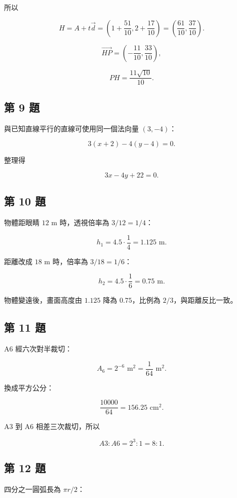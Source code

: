 \documentclass[11pt,a4paper]{article}
\begin{document}
所以

\[
H=A+t\vec d
=\left(1+\frac{51}{10},2+\frac{17}{10}\right)
=\left(\frac{61}{10},\frac{37}{10}\right).
\]

\[
\overrightarrow{HP}=\left(-\frac{11}{10},\frac{33}{10}\right),
\]

\[
PH=\frac{11\sqrt{10}}{10}.
\]

\subsection{第 9 題}\label{ux7b2c-9-ux984c}

與已知直線平行的直線可使用同一個法向量 \((3,-4)\)：

\[
3(x+2)-4(y-4)=0.
\]

整理得

\[
3x-4y+22=0.
\]

\subsection{第 10 題}\label{ux7b2c-10-ux984c}

物體距眼睛 \(12\text{ m}\) 時，透視倍率為 \(3/12=1/4\)：

\[
h_1=4.5\cdot\frac14=1.125\text{ m}.
\]

距離改成 \(18\text{ m}\) 時，倍率為 \(3/18=1/6\)：

\[
h_2=4.5\cdot\frac16=0.75\text{ m}.
\]

物體變遠後，畫面高度由 \(1.125\) 降為 \(0.75\)，比例為 \(2/3\)，與距離反比一致。

\subsection{第 11 題}\label{ux7b2c-11-ux984c}

A6 經六次對半裁切：

\[
A_6=2^{-6}\text{ m}^2=\frac1{64}\text{ m}^2.
\]

換成平方公分：

\[
\frac{10000}{64}=156.25\text{ cm}^2.
\]

A3 到 A6 相差三次裁切，所以

\[
A3:A6=2^3:1=8:1.
\]

\subsection{第 12 題}\label{ux7b2c-12-ux984c}

四分之一圓弧長為 \(\pi r/2\)：
\end{document}
